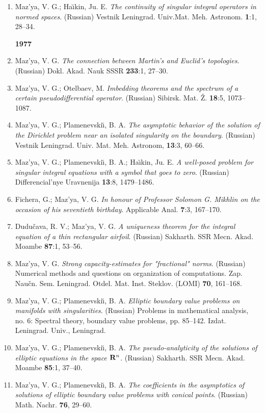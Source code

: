 \documentclass{article}
\begin{document}
\begin{enumerate}
\item Maz'ya, V. G.; Ha{\u\i}kin, Ju. E. {\it The continuity of
singular
integral operators in normed spaces}.
(Russian) Vestnik Leningrad. Univ.Mat. Meh. Astronom. {\bf 1}:1,
28--34.


{\bf 1977}
\item Maz'ya, V. G. {\it The connection between Martin's and Euclid's
topologies}. (Russian) Dokl.
Akad. Nauk SSSR {\bf 233}:1, 27--30.
\item Maz'ya, V. G.; Otelbaev, M. {\it Imbedding theorems and the
spectrum
of a certain
pseudodifferential operator}. (Russian) Sibirsk. Mat. \v Z. {\bf
18}:5,
1073--1087.
\item Maz'ya, V. G.; Plamenevski{\u\i}, B. A. {\it The asymptotic
behavior
of the solution of the Dirichlet problem
near an isolated singularity on the boundary}. (Russian) Vestnik
Leningrad.
Univ. Mat. Meh. Astronom, {\bf 13}:3,
60--66.
\item Maz'ya, V. G.; Plamenevski{\u\i}, B. A.; Ha{\u\i}kin, Ju. E.
{\it A
well-posed problem
for singular integral equations with a symbol that goes to zero}.
(Russian)
Differencial'nye Uravnenija {\bf 13}:8,
1479--1486.
\item Fichera, G.; Maz'ya, V. G. {\it In honour of Professor Solomon
G.
Mikhlin on the occasion of his
seventieth birthday}. Applicable Anal. {\bf 7}:3, 167--170.
\item Dudu\v cava, R. V.; Maz'ya, V. G. {\it A uniqueness theorem for
the
integral equation of a thin
  rectangular airfoil}. (Russian) Sakharth. SSR Mecn. Akad. Moambe
{\bf
87}:1, 53--56.
\item Maz'ya, V. G. {\it Strong capacity-estimates for "fractional"
norms}.
(Russian) Numerical methods and
questions on organization of computations. Zap. Nau\v cn. Sem.
Leningrad.
Otdel. Mat. Inst. Steklov. (LOMI) {\bf 70},
161--168.
\item Maz'ya, V. G.; Plamenevski{\u\i}, B. A. {\it Elliptic boundary
value
problems on manifolds with singularities}.
(Russian) Problems in mathematical analysis, no. 6: Spectral theory,
boundary value problems, pp. 85--142. Izdat.
Leningrad. Univ., Leningrad.
\item Maz'ya, V. G.; Plamenevski{\u\i}, B. A. {\it The
pseudo-analyticity
of the solutions of elliptic
equations in the space ${\bf R}\sp{n}$}. (Russian) Sakharth. SSR Mecn.
Akad. Moambe {\bf 85}:1, 37--40.
\item Maz'ya, V. G.; Plamenevski{\u\i}, B. A. {\it The coefficients in
the
asymptotics of solutions of
elliptic boundary value problems with conical points}. (Russian) Math.
Nachr. {\bf 76}, 29--60.


\end{enumerate}
\end{document}
